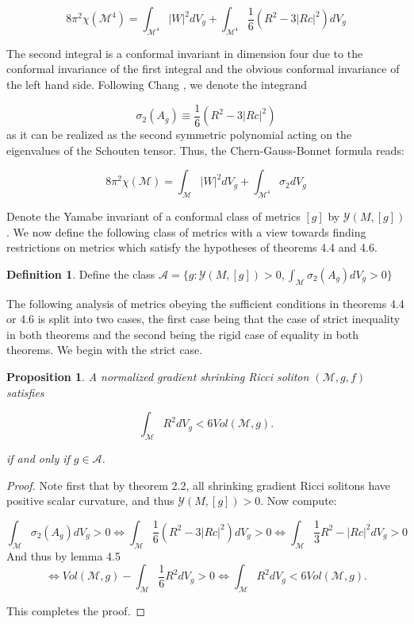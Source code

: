 \documentclass[openany, amssymb, psamsfonts]{amsart}
\newtheorem{prop}{Proposition}[section]
\theoremstyle{definition}
\newtheorem{defn}{Definition}[section]
\numberwithin{equation}{section}
\begin{document}
$$8\pi^2 \chi(\mathcal{M}^4) = \int_{\mathcal{M}^4} |W|^2 dV_g + \int_{\mathcal{M}^4} \frac{1}{6}(R^2 - 3|Rc|^2) dV_g $$

The second integral is a conformal invariant in dimension four due to the conformal invariance of the first integral and the obvious conformal invariance of the left hand side. Following Chang \cite{chang}, we denote the integrand


$$\sigma_2(A_g) \equiv \frac{1}{6}(R^2 - 3|Rc|^2)$$ as it can be realized as the second symmetric polynomial acting on the eigenvalues of the Schouten tensor. Thus, the Chern-Gauss-Bonnet formula reads:


$$8\pi^2 \chi(\mathcal{M}) = \int_{\mathcal{M}} |W|^2 dV_g + \int_{\mathcal{M}^4} \sigma_2 dV_g$$

Denote the Yamabe invariant of a conformal class of metrics $[g]$ by $\mathcal{Y}(M, [g])$. We now define the following class of metrics with a view towards finding restrictions on metrics which satisfy the hypotheses of theorems 4.4 and 4.6.

\begin{defn}
Define the class $\mathcal{A} = \{g : \mathcal{Y}(M, [g]) > 0, \int_{\mathcal{M}} \sigma_2(A_g) dV_g > 0\}$
\end{defn}

The following analysis of metrics obeying the sufficient conditions in theorems 4.4 or 4.6 is split into two cases, the first case being that the case of strict inequality in both theorems and the second being the rigid case of equality in both theorems. We begin with the strict case. 

\begin{prop}
A normalized gradient shrinking Ricci soliton $(\mathcal{M}, g, f)$ satisfies

$$\int_{\mathcal{M}} R^2 dV_g < 6 Vol(\mathcal{M}, g).$$

if and only if $g \in \mathcal{A}$. 

\end{prop}

\begin{proof}

Note first that by theorem 2.2, all shrinking gradient Ricci solitons have positive scalar curvature, and thus $\mathcal{Y}(M, [g]) > 0$. Now compute:

$$\int_{\mathcal{M}} \sigma_2(A_g) dV_g > 0 \iff  
\int_{\mathcal{M}} \frac{1}{6}(R^2 - 3|Rc|^2) dV_g > 0 \iff  \int_{\mathcal{M}} \frac{1}{3}R^2 - |Rc|^2 dV_g > 0$$
And thus by lemma 4.5
$$\iff Vol(\mathcal{M}, g) -  \int_{\mathcal{M}} \frac{1}{6}R^2 dV_g > 0 \iff \int_{\mathcal{M}} R^2 dV_g < 6Vol(\mathcal{M}, g).$$

This completes the proof.

\end{proof}
\end{document}
